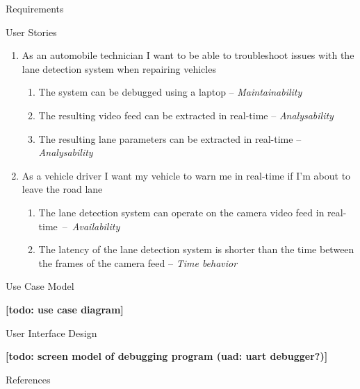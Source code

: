 \documentclass{matthijs}
\begin{document}
\begin{hoofdstuk}{Requirements}
\begin{figuur}{User Stories}
\begin{enumerate}[labelsep=2ex, font=\bfseries]
\begin{enumerate}[leftmargin=8ex]
					\end{enumerate}

				\item	As an automobile technician I want to be able to troubleshoot issues with the lane detection system when repairing vehicles

					\begin{enumerate}[leftmargin=8ex]

						\item	The system can be debugged using a laptop -- \textit{Maintainability}
						\item	The resulting video feed can be extracted in real-time -- \textit{Analysability}
						\item	The resulting lane parameters can be extracted in real-time -- \textit{Analysability}

					\end{enumerate}

				\item	As a vehicle driver I want my vehicle to warn me in real-time if I'm about to leave the road lane

					\begin{enumerate}[leftmargin=8ex]

						\item The lane detection system can operate on the camera video feed in \mbox{real-time -- \textit{Availability}}
						\item The latency of the lane detection system is shorter than the time between the frames of the camera feed -- \textit{Time behavior}

					\end{enumerate}

			\end{enumerate}

		\end{figuur}

	\end{hoofdstuk}

	\begin{hoofdstuk}{Use Case Model}

		\textbf{[todo: use case diagram]}

	\end{hoofdstuk}

	\begin{hoofdstuk}{User Interface Design}

		\textbf{[todo: screen model of debugging program (uad: uart debugger?)]}

	\end{hoofdstuk}

	\begin{hoofdstuk}{References}

		\printbibliography[heading=none]

	\end{hoofdstuk}

	\clearpage
	\thispagestyle{empty}
	\addtocounter{page}{-1}
	\
	\clearpage
\end{document}
